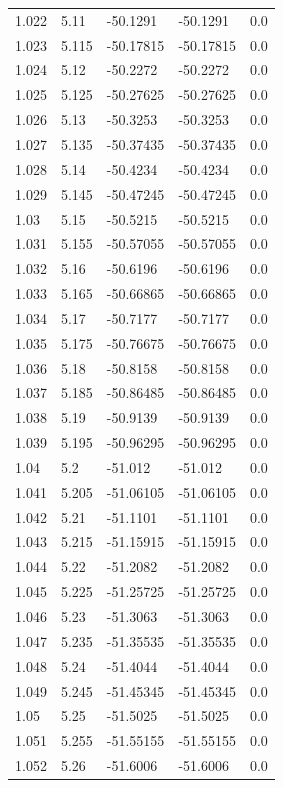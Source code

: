\begin{tabular}{lllll}
1.022 & 5.11 & -50.1291 & -50.1291 & 0.0 \\
1.023 & 5.115 & -50.17815 & -50.17815 & 0.0 \\
1.024 & 5.12 & -50.2272 & -50.2272 & 0.0 \\
1.025 & 5.125 & -50.27625 & -50.27625 & 0.0 \\
1.026 & 5.13 & -50.3253 & -50.3253 & 0.0 \\
1.027 & 5.135 & -50.37435 & -50.37435 & 0.0 \\
1.028 & 5.14 & -50.4234 & -50.4234 & 0.0 \\
1.029 & 5.145 & -50.47245 & -50.47245 & 0.0 \\
1.03 & 5.15 & -50.5215 & -50.5215 & 0.0 \\
1.031 & 5.155 & -50.57055 & -50.57055 & 0.0 \\
1.032 & 5.16 & -50.6196 & -50.6196 & 0.0 \\
1.033 & 5.165 & -50.66865 & -50.66865 & 0.0 \\
1.034 & 5.17 & -50.7177 & -50.7177 & 0.0 \\
1.035 & 5.175 & -50.76675 & -50.76675 & 0.0 \\
1.036 & 5.18 & -50.8158 & -50.8158 & 0.0 \\
1.037 & 5.185 & -50.86485 & -50.86485 & 0.0 \\
1.038 & 5.19 & -50.9139 & -50.9139 & 0.0 \\
1.039 & 5.195 & -50.96295 & -50.96295 & 0.0 \\
1.04 & 5.2 & -51.012 & -51.012 & 0.0 \\
1.041 & 5.205 & -51.06105 & -51.06105 & 0.0 \\
1.042 & 5.21 & -51.1101 & -51.1101 & 0.0 \\
1.043 & 5.215 & -51.15915 & -51.15915 & 0.0 \\
1.044 & 5.22 & -51.2082 & -51.2082 & 0.0 \\
1.045 & 5.225 & -51.25725 & -51.25725 & 0.0 \\
1.046 & 5.23 & -51.3063 & -51.3063 & 0.0 \\
1.047 & 5.235 & -51.35535 & -51.35535 & 0.0 \\
1.048 & 5.24 & -51.4044 & -51.4044 & 0.0 \\
1.049 & 5.245 & -51.45345 & -51.45345 & 0.0 \\
1.05 & 5.25 & -51.5025 & -51.5025 & 0.0 \\
1.051 & 5.255 & -51.55155 & -51.55155 & 0.0 \\
1.052 & 5.26 & -51.6006 & -51.6006 & 0.0 \\

\end{tabular}
